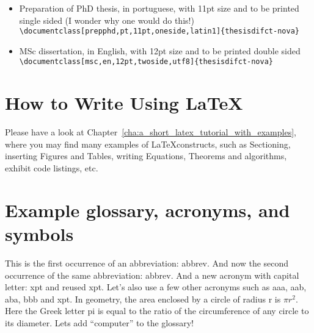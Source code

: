 \begin{itemize}
	\item Preparation of PhD thesis, in portuguese, with 11pt size and to be printed single sided (I wonder why one would do this!)\\
	\verb!\documentclass[prepphd,pt,11pt,oneside,latin1]{thesisdifct-nova}!
	\item MSc dissertation, in English, with 12pt size and to be printed double sided\\
	\verb!\documentclass[msc,en,12pt,twoside,utf8]{thesisdifct-nova}!
\end{itemize}

\section{How to Write Using \LaTeX} %
\label{sec:how_to_write_using_latex}

Please have a look at Chapter~\ref{cha:a_short_latex_tutorial_with_examples}, where you may find many examples of \LaTeX constructs, such as Sectioning, inserting Figures and Tables, writing Equations, Theorems and algorithms, exhibit code listings, etc.




\section{Example glossary, acronyms, and symbols}
%
%
This is the first occurrence of an abbreviation: \gls{abbrev}. And now the second occurrence of the same abbreviation: \gls{abbrev}. And a new acronym with capital letter: \Gls{xpt} and reused \gls{xpt}.  Let's also use a few other acronyms such as \gls{aaa}, \gls{aab}, \gls{aba}, \gls{bbb} and \gls{xpt}.
In geometry, the area enclosed by a circle of radius \gls{r} is $\pi r^2$. Here the Greek letter \gls{pi} is equal to the ratio of the circumference of any circle to its diameter.
Lets add ``\gls{computer}'' to the glossary!
%



